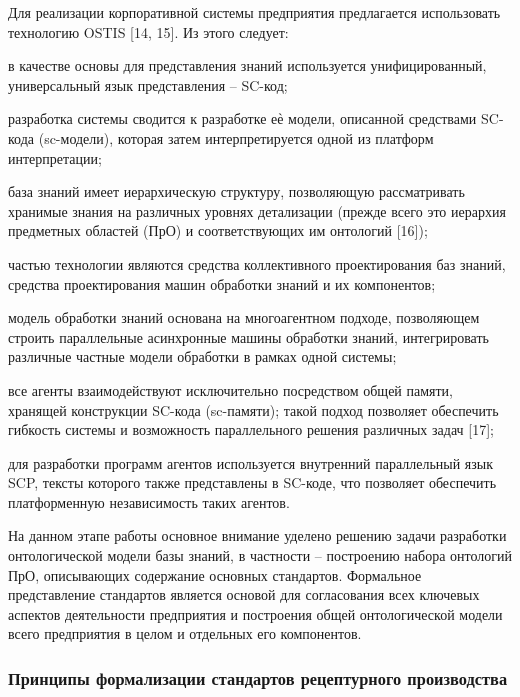 Для реализации корпоративной системы предприятия предлагается использовать технологию OSTIS [14, 15]. Из этого следует:
\begin{textitemize}
    \item в качестве основы для представления знаний используется унифицированный, универсальный язык представления – SC-код;
    \item разработка системы сводится к разработке еѐ модели, описанной средствами SC-кода (sc-модели), которая затем интерпретируется одной из платформ интерпретации;
    \item база знаний имеет иерархическую структуру, позволяющую рассматривать хранимые знания на различных уровнях детализации (прежде всего это иерархия предметных областей (ПрО) и соответствующих им онтологий [16]);
    \item частью технологии являются средства коллективного проектирования баз знаний, средства проектирования машин обработки знаний и их компонентов;
    \item модель обработки знаний основана на многоагентном подходе, позволяющем строить параллельные асинхронные машины обработки знаний, интегрировать различные частные модели обработки в рамках одной системы;
    \item все агенты взаимодействуют исключительно посредством общей памяти, хранящей конструкции SC-кода (sc-памяти); такой подход позволяет обеспечить гибкость системы и возможность параллельного решения различных задач [17];
    \item для разработки программ агентов используется внутренний параллельный язык SCP, тексты которого также представлены в SC-коде, что позволяет обеспечить платформенную независимость таких агентов.
\end{textitemize}

На данном этапе работы основное внимание уделено решению задачи разработки онтологической модели базы знаний, в частности – построению набора онтологий ПрО, описывающих содержание основных стандартов. Формальное представление стандартов является основой для согласования всех ключевых аспектов деятельности предприятия и построения общей онтологической модели всего предприятия в целом и отдельных его компонентов.

\subsubsection{Принципы формализации стандартов рецептурного производства}


